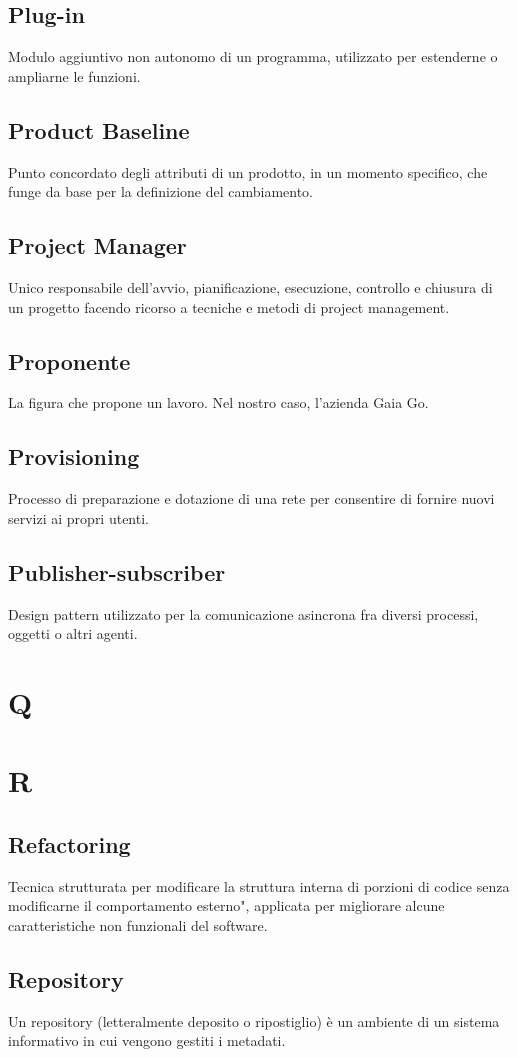 \subsection*{Plug-in} Modulo aggiuntivo non autonomo di un programma, utilizzato per estenderne o ampliarne le funzioni.
\subsection*{Product Baseline} Punto concordato degli attributi di un prodotto, in un momento specifico, che funge da base per la definizione del cambiamento.
\subsection*{Project Manager} Unico responsabile dell'avvio, pianificazione, esecuzione, controllo e chiusura di un progetto facendo ricorso a tecniche e metodi di project management.
\subsection*{Proponente} La figura che propone un lavoro. Nel nostro caso, l'azienda Gaia Go.
\subsection*{Provisioning} Processo di preparazione e dotazione di una rete per consentire di fornire nuovi servizi ai propri utenti.
\subsection*{Publisher-subscriber} Design pattern utilizzato per la comunicazione asincrona fra diversi processi, oggetti o altri agenti.
\newpage
\section{Q}
\newpage
\section{R}
\subsection*{Refactoring} Tecnica strutturata per modificare la struttura interna di porzioni di codice senza modificarne il comportamento esterno", applicata per migliorare alcune caratteristiche non funzionali del software.
\subsection*{Repository} Un repository (letteralmente deposito o ripostiglio) è un ambiente di un sistema informativo in cui vengono gestiti i metadati.
